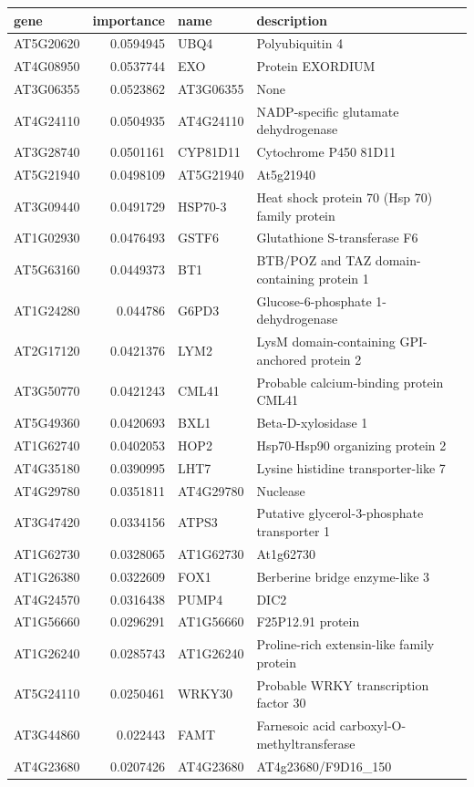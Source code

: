 \documentclass[11pt]{article}
\begin{document}
\begin{center}
\begin{tabular}{lrll}
gene & importance & name & description\\
\hline
AT5G20620 & 0.0594945 & UBQ4 & Polyubiquitin 4\\
AT4G08950 & 0.0537744 & EXO & Protein EXORDIUM\\
AT3G06355 & 0.0523862 & AT3G06355 & None\\
AT4G24110 & 0.0504935 & AT4G24110 & NADP-specific glutamate dehydrogenase\\
AT3G28740 & 0.0501161 & CYP81D11 & Cytochrome P450 81D11\\
AT5G21940 & 0.0498109 & AT5G21940 & At5g21940\\
AT3G09440 & 0.0491729 & HSP70-3 & Heat shock protein 70 (Hsp 70) family protein\\
AT1G02930 & 0.0476493 & GSTF6 & Glutathione S-transferase F6\\
AT5G63160 & 0.0449373 & BT1 & BTB/POZ and TAZ domain-containing protein 1\\
AT1G24280 & 0.044786 & G6PD3 & Glucose-6-phosphate 1-dehydrogenase\\
AT2G17120 & 0.0421376 & LYM2 & LysM domain-containing GPI-anchored protein 2\\
AT3G50770 & 0.0421243 & CML41 & Probable calcium-binding protein CML41\\
AT5G49360 & 0.0420693 & BXL1 & Beta-D-xylosidase 1\\
AT1G62740 & 0.0402053 & HOP2 & Hsp70-Hsp90 organizing protein 2\\
AT4G35180 & 0.0390995 & LHT7 & Lysine histidine transporter-like 7\\
AT4G29780 & 0.0351811 & AT4G29780 & Nuclease\\
AT3G47420 & 0.0334156 & ATPS3 & Putative glycerol-3-phosphate transporter 1\\
AT1G62730 & 0.0328065 & AT1G62730 & At1g62730\\
AT1G26380 & 0.0322609 & FOX1 & Berberine bridge enzyme-like 3\\
AT4G24570 & 0.0316438 & PUMP4 & DIC2\\
AT1G56660 & 0.0296291 & AT1G56660 & F25P12.91 protein\\
AT1G26240 & 0.0285743 & AT1G26240 & Proline-rich extensin-like family protein\\
AT5G24110 & 0.0250461 & WRKY30 & Probable WRKY transcription factor 30\\
AT3G44860 & 0.022443 & FAMT & Farnesoic acid carboxyl-O-methyltransferase\\
AT4G23680 & 0.0207426 & AT4G23680 & AT4g23680/F9D16\_150\\
\end{tabular}
\end{center}
\end{document}
